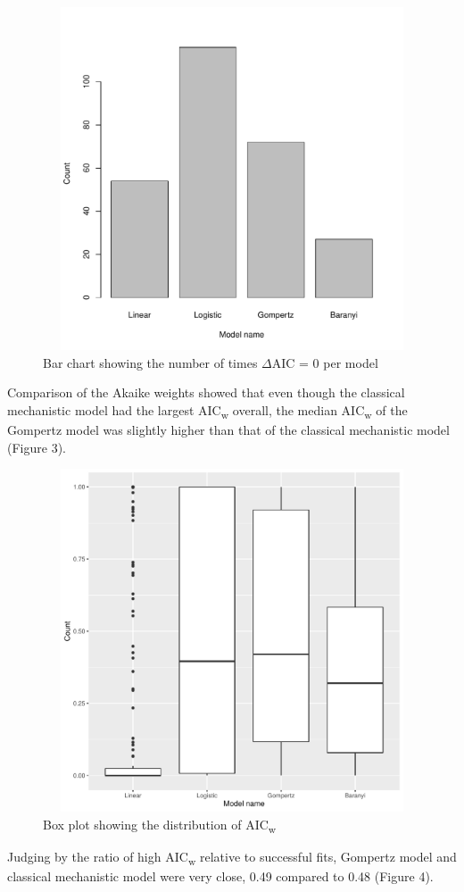 \documentclass[11pt]{article}
\begin{document}
\begin{figure}[H]
\includegraphics[keepaspectratio, width = 5in, height = 4in]{../results/lowAIC.pdf}
\centering
\caption{Bar chart showing the number of times {$\Delta$AIC} = 0 per model}
\end{figure}
\newpage
Comparison of the Akaike weights showed  that even though the classical mechanistic model had the largest {AIC\textsubscript{w}} overall, the median {AIC\textsubscript{w}} of the Gompertz model was slightly higher than that of the classical mechanistic model (Figure 3).

\begin{figure}[H]
\includegraphics[keepaspectratio, width = 5in, height = 4in]{../results/aicw.pdf}
\centering
\caption{Box plot showing the distribution of {AIC\textsubscript{w}}}
\end{figure}
\newpage
Judging by the ratio of high {AIC\textsubscript{w}} relative to successful fits, Gompertz model and classical mechanistic model were very close, 0.49 compared to 0.48 (Figure 4).
\end{document}

